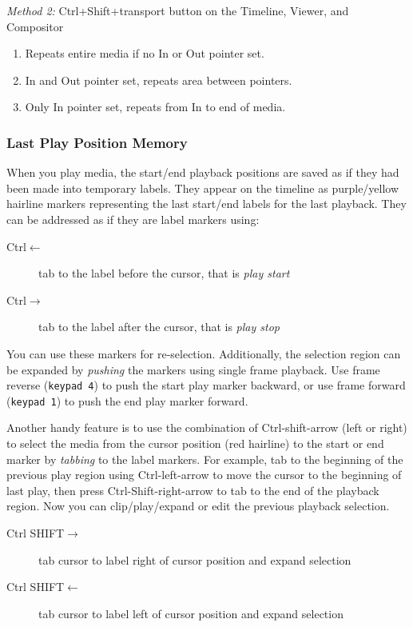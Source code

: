\textit{Method 2:} Ctrl+Shift+transport button on the Timeline, Viewer, and Compositor

\begin{enumerate}
    \item Repeats entire media if no In or Out pointer set.
    \item  In and Out pointer set, repeats area between pointers.
    \item  Only In pointer set, repeats from In to end of media.
\end{enumerate}

\subsubsection*{Last Play Position Memory}%
\label{ssub:last_play_position_memory}


When you play media, the start/end playback positions are saved as if they had been made into temporary labels.  
They appear on the timeline as purple/yellow hairline markers representing the last start/end labels for the last playback. 
They can be addressed as if they are label markers using:

\begin{description}
    \item[Ctrl$\leftarrow$]   tab to the label before the cursor, that is \textit{play start}
    \item[Ctrl$\rightarrow$]   tab to the label after the cursor, that is \textit{play stop}
\end{description}


You can use these markers for re-selection.  
Additionally, the selection region can be expanded by \textit{pushing} the markers using single frame playback.  
Use frame reverse (\texttt{keypad 4}) to push the start play marker backward, or use frame forward (\texttt{keypad 1}) to push the end play marker forward.

Another handy feature is to use the combination of Ctrl-shift-arrow (left or right) to select the media from the cursor position (red hairline) to the start or end marker by \textit{tabbing} to the label markers.  
For example, tab to the beginning of the previous play region using Ctrl-left-arrow to move the cursor to the beginning of last play, then press Ctrl-Shift-right-arrow to tab to the end of the playback region. 
Now you can clip/play/expand or edit the previous playback selection.

\begin{description}
    \item[Ctrl SHIFT$\rightarrow$] 	  tab cursor to label right of cursor position and expand selection
    \item[Ctrl SHIFT$\leftarrow$] 	  tab cursor to label left of cursor position and expand selection
\end{description}


